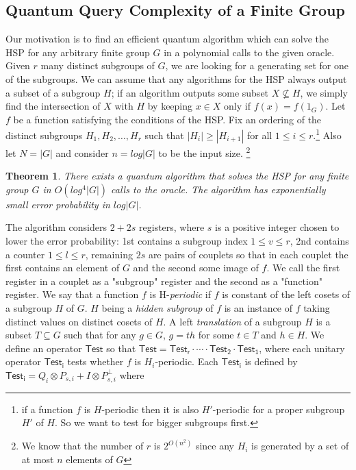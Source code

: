 \documentclass[12pt]{article}
\theoremstyle{plain}
\newtheorem{thm}{Theorem} %
\theoremstyle{definition}
\begin{document}
\subsection{Quantum Query Complexity of a Finite Group}
Our motivation is to find an efficient quantum algorithm which can solve the HSP for any arbitrary finite group $G$ in a polynomial calls to the given oracle. Given $r$ many distinct subgroups of $G$, we are looking for a generating set for one of the subgroups. We can assume that any algorithms for the HSP always output a subset of a subgroup $H$; if an algorithm outputs some subset $X\nsubseteq H$, we simply find the intersection of $X$ with $H$ by keeping $x\in X$ only if $f(x)=f(1_G)$.
\newline
Let $f$ be a function satisfying the conditions of the HSP. Fix an ordering of the distinct subgroups $H_1,H_2,\ldots,H_r$ such that $|H_{i}|\geq|H_{i+1}|$ for all $1\leq i \leq r$.\footnote{
if a function $f$ is $H$-periodic then it is also $H'$-periodic for a proper subgroup $H'$ of $H$. So we want to test for bigger subgroups first.}
Also let $N=|G|$ and consider $n=log|G|$ to be the input size. 
\footnote{
We know that the number of $r$ is $2^{O(n^2)}$ since any $H_i$ is generated by a set of at most $n$ elements of $G$}
\begin{thm}\label{thm3}
There exists a quantum algorithm that solves the HSP for any finite group $G$ in $O(log^4|G|)$ calls to the oracle. The algorithm has exponentially small error probability in $log|G|$.
\end{thm}
\noindent The algorithm considers $2+2s$ registers, where $s$ is a positive integer chosen to lower the error probability: 1st contains a subgroup index $1\leq v \leq r$, 2nd contains a counter $1\leq l \leq r$, remaining $2s$ are pairs of couplets so that in each couplet the first contains an element of $G$ and the second some image of $f$. We call the first register in a couplet as a "subgroup" register and the second as a "function" register.
\newline
We say that a function $f$ is H-\emph{periodic} if $f$ is constant of the left cosets of a subgroup $H$ of $G$. $H$ being a \emph{hidden subgroup} of $f$ is an instance of $f$ taking distinct values on distinct cosets of $H$.
\newline
A left \emph{translation} of a subgroup $H$ is a subset $T\subseteq G$ such that for any $g\in G$, $g=th$ for some $t\in T$ and $h\in H$.
\newline
We define an operator ${\mathsf{Test}}$ so that ${\mathsf{Test}}={\mathsf{Test_r}}\cdot\cdots\cdot{\mathsf{Test_2}}\cdot{\mathsf{Test_1}}$, where each unitary operator ${\mathsf{Test_i}}$ tests whether $f$ is $H_i$-periodic. Each ${\mathsf{Test_i}}$ is defined by ${\mathsf{Test_i}}=Q_i\otimes P_{s,i}+I\otimes P^{\perp}_{s,i}$ where
\end{document}
